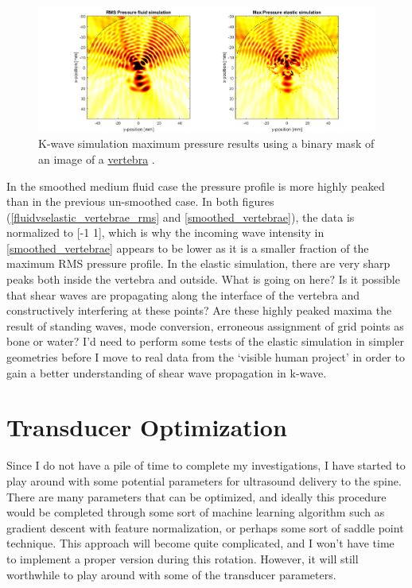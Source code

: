 \documentclass[10pt,a4paper]{article}
\begin{document}
\begin{figure}[H]
\hspace*{-4cm}
\includegraphics[scale=0.7]{max_p_smoothed_vert}
\caption{K-wave simulation maximum pressure results using a binary mask of an image of a \href{https://www.cedars-sinai.edu/Patients/Programs-and-Services/Spine-Center/The-Patient-Guide/Anatomy-of-the-Spine/Vertebrae-of-the-Spine.aspx}{vertebra} .}\label{max_p_smoothed_vert}
\end{figure} 


In the smoothed medium fluid case the pressure profile is more highly peaked than in the previous un-smoothed case. In both figures (\ref{fluidvselastic_vertebrae_rms} and \ref{smoothed_vertebrae}), the data is normalized to [-1 1], which is why the incoming wave intensity in \ref{smoothed_vertebrae} appears to be lower as it is a smaller fraction of the maximum RMS pressure profile. In the elastic simulation, there are very sharp peaks both inside the vertebra and outside. What is going on here? Is it possible that shear waves are propagating along the interface of the vertebra and constructively interfering at these points? Are these highly peaked maxima the result of standing waves, mode conversion, erroneous assignment of grid points as bone or water? I'd need to perform some tests of the elastic simulation in simpler geometries before I move to real data from the `visible human project' in order to gain a better understanding of shear wave propagation in k-wave. 

\section*{Transducer Optimization}

Since I do not have a pile of time to complete my investigations, I have started to play around with some potential parameters for ultrasound delivery to the spine. There are many parameters that can be optimized, and ideally this procedure would be completed through some sort of machine learning algorithm such as gradient descent with feature normalization, or perhaps some sort of saddle point technique. This approach will become quite complicated, and I won't have time to implement a proper version during this rotation. However, it will still worthwhile to play around with some of the transducer parameters. 
\end{document}
